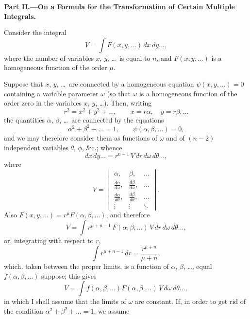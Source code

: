 \documentclass[11pt,a4paper]{article}
\theoremstyle{definition}
\begin{document}
\newpage
\begin{center}
\textbf{Part II.---On a Formula for the Transformation of Certain Multiple Integrals.}
\end{center}

\setcounter{page}{438}

Consider the integral
\[
V = \int F(x, y, \ldots)\, dx\, dy\ldots,
\]
where the number of variables $x$, $y$, \ldots\ is equal to $n$, and $F(x, y, \ldots)$ is a homogeneous function of the order $\mu$.

Suppose that $x$, $y$, \ldots\ are connected by a homogeneous equation $\psi(x, y, \ldots) = 0$ containing a variable parameter $\omega$ (so that $\omega$ is a homogeneous function of the order zero in the variables $x$, $y$, \ldots). Then, writing
\[
r^{2} = x^{2} + y^{2} + \ldots, \qquad x = r\alpha, \quad y = r\beta, \ldots
\]
the quantities $\alpha$, $\beta$, \ldots\ are connected by the equations
\[
\alpha^{2} + \beta^{2} + \ldots = 1, \qquad \psi(\alpha, \beta, \ldots) = 0,
\]
and we may therefore consider them as functions of $\omega$ and of $(n-2)$ independent variables $\theta$, $\phi$, \&c.; whence
\[
dx\, dy\ldots = r^{n-1}\, V\, dr\, d\omega\, d\theta\ldots,
\]
where
\[
V = \begin{vmatrix}
\alpha, & \beta, & \ldots \\
\frac{d\alpha}{d\omega}, & \frac{d\beta}{d\omega}, & \ldots \\
\frac{d\alpha}{d\theta}, & \frac{d\beta}{d\theta}, & \ldots \\
\vdots & \vdots & \ddots
\end{vmatrix}.
\]
Also $F(x, y, \ldots) = r^{\mu}F(\alpha, \beta, \ldots)$, and therefore
\[
V = \int r^{\mu+n-1}\, F(\alpha, \beta, \ldots)\, V\, dr\, d\omega\, d\theta\ldots,
\]
or, integrating with respect to $r$,
\[
\int r^{\mu+n-1}\, dr = \frac{r^{\mu+n}}{\mu+n},
\]
which, taken between the proper limits, is a function of $\alpha$, $\beta$, \ldots, equal $f(\alpha, \beta, \ldots)$ suppose; this gives
\[
V = \int f(\alpha, \beta, \ldots)F(\alpha, \beta, \ldots)\, V\, d\omega\, d\theta\ldots,
\]
in which I shall assume that the limits of $\omega$ are constant. If, in order to get rid of the condition $\alpha^{2} + \beta^{2} + \ldots = 1$, we assume

\newpage

\setcounter{page}{439}
\end{document}
